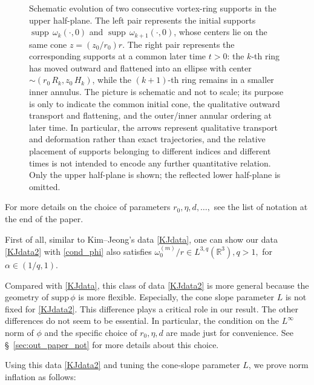 \documentclass[reqno,11pt]{amsart}
\begin{document}
\begin{figure}[t]
\begin{tikzpicture}[x=1cm,y=1cm,>=Latex, line cap=round, line join=round]
\end{tikzpicture}
\caption{Schematic evolution of two consecutive vortex-ring supports in the upper half-plane. The left pair represents the initial supports $\operatorname{supp}\,\omega_k(\cdot,0)$ and $\operatorname{supp}\,\omega_{k+1}(\cdot,0)$, whose centers lie on the same cone $z=(z_0/r_0)r$. The right pair represents the corresponding supports at a common later time $t>0$: the $k$-th ring has moved outward and flattened into an ellipse with center $\sim (r_0 \, R_k,z_0 \, H_k)$, while the $(k+1)$-th ring remains in a smaller inner annulus. The picture is schematic and not to scale; its purpose is only to indicate the common initial cone, the qualitative outward transport and flattening, and the outer/inner annular ordering at later time. In particular, the arrows represent qualitative transport and deformation rather than exact trajectories, and the relative placement of supports belonging to different indices and different times is not intended to encode any further quantitative relation. Only the upper half-plane is shown; the reflected lower half-plane is omitted.}
\label{fig:sch_evol}
\end{figure}






 



For more details on the choice of parameters $r_0, \eta, d, \ldots,$ see the list of notation at the end of the paper.


First of all, similar to Kim--Jeong's data \eqref{KJdata}, one can show our data \eqref{KJdata2} with \eqref{cond_phi}  also satisfies $\omega_0^{(m)}/r\in L^{3,q}(\mathbb{R}^3), q>1,$ for $\alpha\in (1/q,1)$.

Compared with \eqref{KJdata}, this class of data \eqref{KJdata2} is  more general because the geometry of $\mathrm{supp} \, \phi$ is more flexible. Especially, the cone slope parameter $L$ is not fixed for \eqref{KJdata2}. This difference plays a critical role in our result. The other differences do not seem to be essential. In particular, the condition on the $L^\infty$ norm of $\phi$ and the specific choice of $r_0, \eta,d $ are made just for convenience. See \S~\ref{sec:out_paper_not} for more details about this choice.

Using this data \eqref{KJdata2} and tuning the cone-slope parameter $L$, we prove norm inflation as follows:
\end{document}
